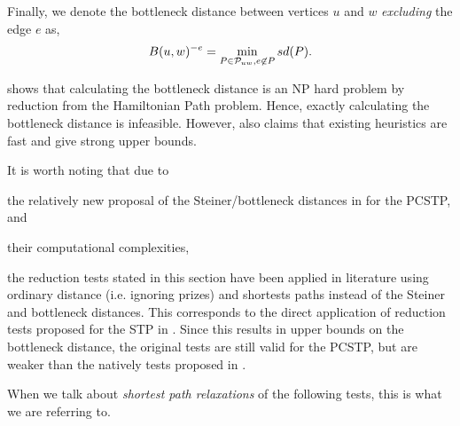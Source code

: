 
  Finally, we denote the bottleneck distance between vertices $u$ and $w$ \textit{excluding}
  the edge $e$ as,
  $$B(u,w)^{-e} = \min_{P \in  \mathcal{P}_{uw}, e \not \in P} sd(P)\mathnormal{.}$$


 \cite{uchoa2006reduction} shows that calculating the bottleneck distance
 is an NP hard problem by reduction from the Hamiltonian Path problem. Hence,
 exactly calculating the bottleneck distance is infeasible. However, \cite{uchoa2006reduction}
 also claims that existing heuristics are fast and give strong upper bounds.

It is worth noting that due to
\begin{enumerate*}[label={\alph*)}]
\item the relatively new proposal of the Steiner/bottleneck distances in \cite{uchoa2006reduction} for the PCSTP, and
\item their computational complexities,
\end{enumerate*}
the reduction tests stated in this section have been applied in literature
using ordinary distance (i.e. ignoring prizes) and shortests paths
instead of the Steiner and bottleneck distances. This corresponds to the direct application of
reduction tests
proposed for the STP in \cite{duin1989edge,duin1989reduction}. Since this results in
upper bounds on the bottleneck distance, the original
tests are still valid for the PCSTP,
but are weaker than the natively tests proposed in \cite{uchoa2006reduction}.

When we talk
 about \textit{shortest path relaxations} of the following tests, this is what we are referring to.

